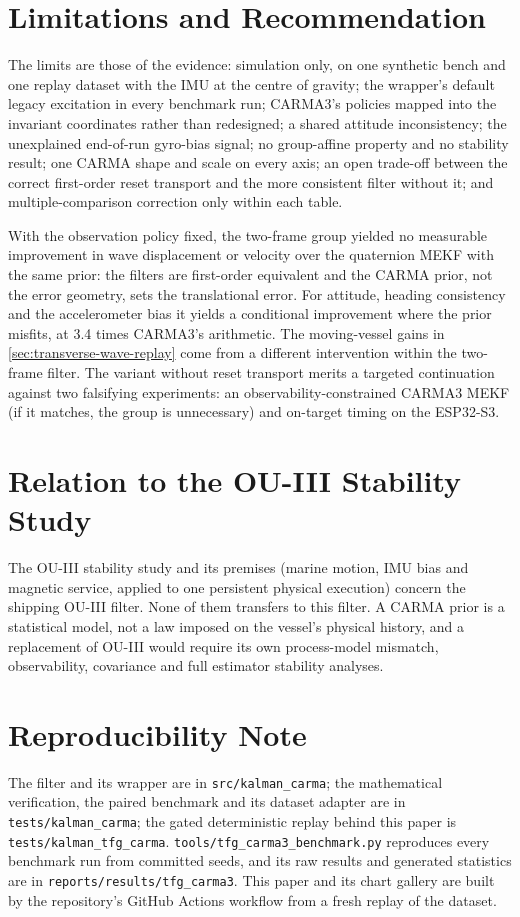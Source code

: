 \documentclass[conference]{IEEEtran}
\theoremstyle{bodysmall}
\begin{document}
\section{Limitations and Recommendation}
\label{sec:recommend}
The limits are those of the evidence: simulation only, on one synthetic bench
and one replay dataset with the IMU at the centre of gravity; the wrapper's
default legacy excitation in every benchmark run; CARMA3's
policies mapped into the invariant coordinates rather than redesigned; a
shared attitude inconsistency; the unexplained end-of-run gyro-bias signal;
no group-affine property and no stability result; one CARMA shape and scale
on every axis; an open trade-off between the correct first-order reset
transport and the more consistent filter without it; and multiple-comparison
correction only within each table.

With the observation policy fixed, the two-frame group yielded no measurable
improvement in wave displacement or velocity over the
quaternion MEKF with the same prior: the filters are first-order equivalent
and the CARMA prior, not the error geometry, sets the translational error.
For attitude, heading consistency and the accelerometer bias it yields a
conditional improvement where the prior misfits, at 3.4 times CARMA3's
arithmetic. The moving-vessel gains in \cref{sec:transverse-wave-replay}
come from a different intervention within the two-frame filter. The variant without reset transport merits a targeted continuation
against two falsifying experiments: an observability-constrained CARMA3 MEKF
(if it matches, the group is unnecessary) and on-target timing on the
ESP32-S3.

\section{Relation to the OU-III Stability Study}
The OU-III stability study and its premises (marine motion, IMU bias and
magnetic service, applied to one persistent physical execution) concern the
shipping OU-III filter. None of them transfers to this filter. A CARMA prior
is a statistical model, not a law imposed on the vessel's physical history,
and a replacement of OU-III would require its own process-model mismatch,
observability, covariance and full estimator stability analyses.

\section*{Reproducibility Note}
The filter and its wrapper are in \texttt{src/kalman\_carma}; the
mathematical verification, the paired benchmark and its dataset adapter are in
\texttt{tests/kalman\_carma}; the gated deterministic replay behind this paper
is \texttt{tests/kalman\_tfg\_carma}. \texttt{tools/tfg\_carma3\_benchmark.py}
reproduces every benchmark run from committed seeds, and its raw results and
generated statistics are in \texttt{reports/results/tfg\_carma3}. This paper
and its chart gallery are built by the repository's GitHub Actions workflow
from a fresh replay of the dataset.
\end{document}
